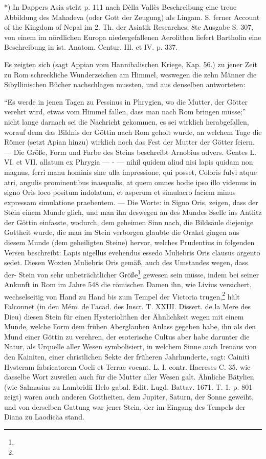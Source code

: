 \documentclass[a4paper, 11pt, oneside, polutonikogreek, german]{article}
\begin{document}
*) In Dappers Asia steht p. 111 nach Dèlla Vallès Beschreibung eine treue Abbildung des Mahadeva (oder Gott der Zeugung) als Lingam. S. ferner Account of the Kingdom of Nepal im 2. Th. der Asiatik Researches, 8te Ausgabe S. 307, von einem im nördlichen Europa niedergefallenen Aerolithen liefert Bartholin eine Beschreibung in ist. Anatom. Centur. IIl. et IV. p. 337.

Es zeigten sich (sagt Appian vom Hannibalischen Kriege, Kap. 56.) zu jener Zeit zu Rom schreckliche Wunderzeichen am Himmel, weswegen die zehn Männer die Sibyllinischen Bücher nachschlagen mussten, und aus denselben antworteten:

"`Es werde in jenen Tagen zu Pessinus in Phrygien, wo die Mutter, der Götter verehrt wird, etwas vom Himmel fallen, dass man nach Rom bringen müsse;"' nicht lange darnach sei die Nachricht gekommen, es sei wirklich herabgefallen, worauf denn das Bildnis der Göttin nach Rom geholt wurde, an welchem Tage die Römer (setzt Apian hinzu) wirklich noch das Fest der Mutter der Götter feiern. --- Die Größe, Form und Farbe des Steins beschreibt Arnobius advers. Gentes L. VI. et VII. allatum ex Phrygia --- - --- nihil quidem aliud nisi lapis quidam non magnus, ferri manu hominis sine ulla impressione, qui posset, Coloris fulvi atque atri, angulis prominentibus inaequalis, at quem omnes hodie ipso illo videmus in signo Oris loco positum indolatum, et asperum et simulacro faciem minus expressam simulatione praebentem. --- Die Worte: in Signo Oris, zeigen, dass der Stein einem Munde glich, und man ihn deswegen an des Mundes Sselle ins Antlitz der Göttin einfasste, wodurch, dem geheimen Sinn nach, die Bildsäule diejenige Gottheit wurde, die man im Stein verborgen glaubte die Orakel gingen aus diesem Munde (dem geheiligten Steine) hervor, welches Prudentius in folgenden Versen beschreibt: Lapis nigellus evehendus essedo Muliebris Oris clausus argento sedet. Diesen Woxten Muliebris Oris gemäß, auch des Umstandes wegen, dass der- Stein von sehr unbeträchtlicher Größe\footnote{} gewesen sein müsse, indem bei seiner Ankunft in Rom im Jahre 548 die römischen Damen ihn, wie Livius versichert, wechselseitig von Hand zu Hand bis zum Tempel der Victoria trugen,\footnote{} hält Falconnet (in den Mém. de l'acad. des Inscr. T. XXIII. Dissert. de la Mere des Dieu) diesen Stein für einen Hysteriolithen der Ähnlichkeit wegen mit einem Munde, welche Form dem frühen Aberglauben Anlass gegeben habe, ihn als den Mund einer Göttin zu verehren, der esoterische Cultus aber habe darunter die Natur, als Urquelle aller Wesen symbolisiert, in welchem Sinne auch Irenäus von den Kainiten, einer christlichen Sekte der früheren Jahrhunderte, sagt: Cainiti Hysteram fabricatorem Coeli et Terrae vocant. L. I. contr. Haereses C. 35. wie dasselbe Wort zuweilen auch für die Mutter aller Wesen galt. Ähnliche Bätylien (wie Salmasius zu Lambridii Helo gabal. Edit. Lugd. Battav. 1671. T. 1. p. 801 zeigt) waren auch anderen Gottheiten, dem Jupiter, Saturn, der Sonne geweiht, und von derselben Gattung war jener Stein, der im Eingang des Tempels der Diana zu Laodicäa stand.
\end{document}
